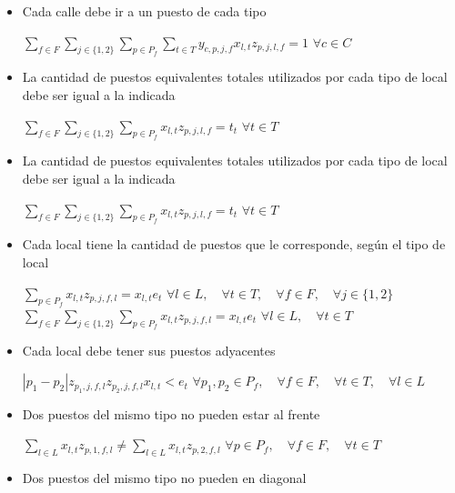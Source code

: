 \documentclass[12pt]{article}
\begin{document}
\begin{itemize}
    \item Cada calle debe ir a un puesto de cada tipo
    
    $\sum\limits_{f \in F} \sum\limits_{j \in \{1,2\}} \sum\limits_{p \in P_f} \sum\limits_{t \in T} y_{c,p,j,f} x_{l,t} z_{p,j,l,f} = 1$ \tab $\forall c \in C$ 
    
    \item La cantidad de puestos equivalentes totales utilizados por cada tipo de local debe ser igual a la indicada
    
    $\sum\limits_{f \in F} \sum\limits_{j \in \{1,2\}} \sum\limits_{p \in P_f} x_{l,t} z_{p,j,l,f} = t_t$ \tab $\forall t \in T$ 
    
    \item La cantidad de puestos equivalentes totales utilizados por cada tipo de local debe ser igual a la indicada
    
    $\sum\limits_{f \in F} \sum\limits_{j \in \{1,2\}} \sum\limits_{p \in P_f} x_{l,t} z_{p,j,l,f} = t_t$ \tab $\forall t \in T$
    
    \item Cada local tiene la cantidad de puestos que le corresponde, según el tipo de local
    
    $\sum\limits_{p \in P_f} x_{l,t} z_{p,j,f,l} = x_{l,t} e_t $ \tab $\forall l \in L, \quad \forall t \in T, \quad \forall f \in F, \quad \forall j \in \{1,2\}$ \\
    
    $\sum\limits_{f \in F} \sum\limits_{j \in \{1,2\}} \sum\limits_{p \in P_f} x_{l,t} z_{p,j,f,l} = x_{l,t}e_t $ \tab $\forall l \in L, \quad \forall t \in T$  
    
    \item Cada local debe tener sus puestos adyacentes
    
    $|p_1 - p_2|z_{p_1,j,f,l} z_{p_2,j,f,l} x_{l,t} < e_t $ \tab $\forall p_1, p_2 \in P_f, \quad \forall f \in F, \quad \forall t \in T, \quad \forall l \in L$ 
    
    \item Dos puestos del mismo tipo no pueden estar al frente
    
    $\sum\limits_{l \in L} x_{l,t} z_{p,1,f,l} \neq \sum\limits_{l \in L} x_{l,t} z_{p,2,f,l} $ \tab $\forall p \in P_f, \quad \forall f \in F, \quad \forall t \in T$ 
    
    \item Dos puestos del mismo tipo no pueden en diagonal
    

\end{itemize}
\end{document}
